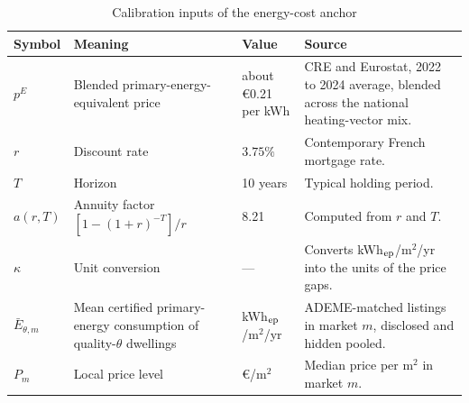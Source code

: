 \begin{table}[htbp]
\centering
\caption{Calibration inputs of the energy-cost anchor}
\label{tab:app_calib}
\footnotesize\renewcommand{\arraystretch}{1.25}
\begin{tabular}{@{}llll@{}}
\toprule\toprule
\textbf{Symbol} & \textbf{Meaning} & \textbf{Value} & \textbf{Source} \\
\midrule
\parbox[t]{.09\textwidth}{\raggedright $p^E$} & \parbox[t]{.28\textwidth}{\raggedright Blended primary-energy-equivalent price} & \parbox[t]{.18\textwidth}{\raggedright about \euro0.21 per kWh} & \parbox[t]{.36\textwidth}{\raggedright CRE and Eurostat, 2022 to 2024 average, blended across the national heating-vector mix.} \\[12pt]
\parbox[t]{.09\textwidth}{\raggedright $r$} & \parbox[t]{.28\textwidth}{\raggedright Discount rate} & \parbox[t]{.18\textwidth}{\raggedright $3.75\%$} & \parbox[t]{.36\textwidth}{\raggedright Contemporary French mortgage rate.} \\[12pt]
\parbox[t]{.09\textwidth}{\raggedright $T$} & \parbox[t]{.28\textwidth}{\raggedright Horizon} & \parbox[t]{.18\textwidth}{\raggedright 10 years} & \parbox[t]{.36\textwidth}{\raggedright Typical holding period.} \\[12pt]
\parbox[t]{.09\textwidth}{\raggedright $a(r,T)$} & \parbox[t]{.28\textwidth}{\raggedright Annuity factor $[1-(1+r)^{-T}]/r$} & \parbox[t]{.18\textwidth}{\raggedright 8.21} & \parbox[t]{.36\textwidth}{\raggedright Computed from $r$ and $T$.} \\[12pt]
\parbox[t]{.09\textwidth}{\raggedright $\kappa$} & \parbox[t]{.28\textwidth}{\raggedright Unit conversion} & \parbox[t]{.18\textwidth}{\raggedright ---} & \parbox[t]{.36\textwidth}{\raggedright Converts kWh$_{\rm ep}$/m$^2$/yr into the units of the price gaps.} \\[12pt]
\parbox[t]{.09\textwidth}{\raggedright $\bar E_{\theta,m}$} & \parbox[t]{.28\textwidth}{\raggedright Mean certified primary-energy consumption of quality-$\theta$ dwellings} & \parbox[t]{.18\textwidth}{\raggedright kWh$_{\rm ep}$/m$^2$/yr} & \parbox[t]{.36\textwidth}{\raggedright ADEME-matched listings in market $m$, disclosed and hidden pooled.} \\[12pt]
\parbox[t]{.09\textwidth}{\raggedright $P_m$} & \parbox[t]{.28\textwidth}{\raggedright Local price level} & \parbox[t]{.18\textwidth}{\raggedright \euro/m$^2$} & \parbox[t]{.36\textwidth}{\raggedright Median price per m$^2$ in market $m$.} \\[12pt]
\bottomrule
\end{tabular}
\end{table}

